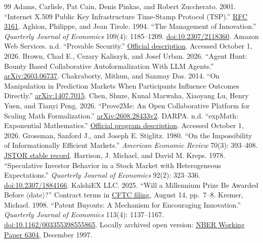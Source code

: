 \documentclass[11pt,a4paper]{article}
\begin{document}
\clearpage
\begin{thebibliography}{99}
\small
{} Adams, Carlisle, Pat Cain, Denis Pinkas, and Robert Zuccherato. 2001. ``Internet X.509 Public Key Infrastructure Time-Stamp Protocol (TSP).'' \href{https://www.rfc-editor.org/rfc/rfc3161}{RFC 3161}.
 Aghion, Philippe, and Jean Tirole. 1994. ``The Management of Innovation.'' \emph{Quarterly Journal of Economics} 109(4): 1185--1209. \href{https://doi.org/10.2307/2118360}{doi:10.2307/2118360}.
 Amazon Web Services. n.d. ``Provable Security.'' \href{https://aws.amazon.com/security/provable-security/}{Official description}. Accessed October 1, 2026.
 Brown, Chad E., Cezary Kaliszyk, and Josef Urban. 2026. ``Agent Hunt: Bounty Based Collaborative Autoformalization With LLM Agents.'' \href{https://arxiv.org/abs/2603.06737}{arXiv:2603.06737}.
 Chakraborty, Mithun, and Sanmay Das. 2014. ``On Manipulation in Prediction Markets When Participants Influence Outcomes Directly.'' \href{https://arxiv.org/abs/1407.7015}{arXiv:1407.7015}.
 Chen, Shuze, Kunal Marwaha, Xiaoyang Lu, Henry Yuen, and Tianyi Peng. 2026. ``Prove2Me: An Open Collaborative Platform for Scaling Math Formalization.'' \href{https://arxiv.org/html/2608.28433v2}{arXiv:2608.28433v2}.
 DARPA. n.d. ``expMath: Exponential Mathematics.'' \href{https://www.darpa.mil/research/programs/expmath-exponential-mathematics}{Official program description}. Accessed October 1, 2026.
 Grossman, Sanford J., and Joseph E. Stiglitz. 1980. ``On the Impossibility of Informationally Efficient Markets.'' \emph{American Economic Review} 70(3): 393--408. \href{https://www.jstor.org/stable/1805228}{JSTOR stable record}.
 Harrison, J. Michael, and David M. Kreps. 1978. ``Speculative Investor Behavior in a Stock Market with Heterogeneous Expectations.'' \emph{Quarterly Journal of Economics} 92(2): 323--336. \href{https://doi.org/10.2307/1884166}{doi:10.2307/1884166}.
 KalshiEX LLC. 2025. ``Will a Millennium Prize Be Awarded Before $\langle$date$\rangle$?'' Contract terms in \href{https://www.cftc.gov/filings/ptc/ptc08142528943.pdf}{CFTC filing}, August 14, pp.~7--8.
 Kremer, Michael. 1998. ``Patent Buyouts: A Mechanism for Encouraging Innovation.'' \emph{Quarterly Journal of Economics} 113(4): 1137--1167. \href{https://doi.org/10.1162/003355398555865}{doi:10.1162/003355398555865}. Locally archived open version: \href{https://www.nber.org/system/files/working_papers/w6304/w6304.pdf}{NBER Working Paper 6304}, December 1997.

\end{thebibliography}
\end{document}
